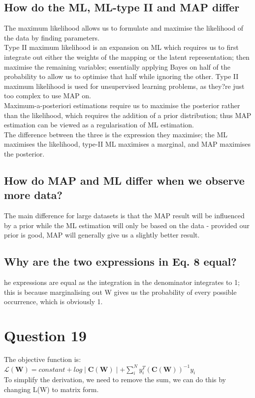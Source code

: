 \documentclass[a4paper, 9pt]{article}
\begin{document}
\subsection*{How do the ML, ML-type II and MAP differ}
The maximum likelihood allows us to formulate and maximise the likelihood of the data by finding parameters. \\
Type II maximum likelihood is an expansion on ML which requires us to first integrate out either the weights of the mapping or the latent representation; then maximise the remaining variables; essentially applying Bayes on half of the probability to allow us to optimise that half while ignoring the other. Type II maximum likelihood is used for unsupervised learning problems, as they?re just too complex to use MAP on. \\
Maximum-a-posteriori estimations require us to maximise the posterior rather than the likelihood, which requires the addition of a prior distribution; thus MAP estimation can be viewed as a regularisation of ML estimation. \\
The difference between the three is the expression they maximise; the ML maximises the likelihood, type-II ML maximises a marginal, and MAP maximises the posterior. 
\subsection*{How do MAP and ML differ when we observe more data?}
The main difference for large datasets is that the MAP result will be influenced by a prior while the ML estimation will only be based on the data - provided our prior is good, MAP will generally give us a slightly better result. 
\subsection*{Why are the two expressions in Eq. 8 equal?}
he expressions are equal as the integration in the denominator integrates to 1; this is because marginalising out W gives us the probability of every possible occurrence, which is obviously 1.

\section*{Question 19}
The objective function is: \\
\( \mathcal{L} (\mathbf{W}) = constant + log\mid \mathbf{C}(\mathbf{W})\mid + \sum\limits_{i}^N y_{i}^{T}(\mathbf{C}(\mathbf{W}))^{-1} y_{i} \) \\
\newline
To simplify the derivation, we need to remove the sum, we can do this by changing L(W) to matrix form. \\
\end{document}
